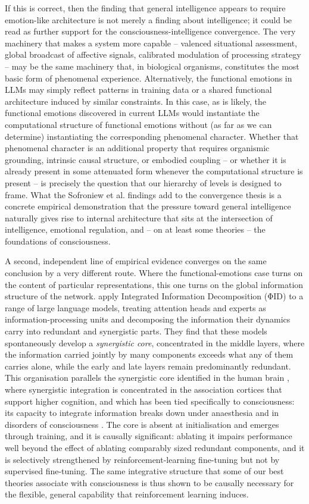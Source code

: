 \documentclass[11pt, a4paper, onecolumn, gdm]{google}
\begin{document}
If this is correct, then the finding that general intelligence appears to require emotion-like architecture is not merely a finding about intelligence; it could be read as further support for the consciousness-intelligence convergence.
The very machinery that makes a system more capable -- valenced situational assessment, global broadcast of affective signals, calibrated modulation of processing strategy -- may be the same machinery that, in biological organisms, constitutes the most basic form of phenomenal experience.
Alternatively, the functional emotions in LLMs may simply reflect patterns in training data or a shared functional architecture induced by similar constraints. In this case, as is likely, the functional emotions discovered in current LLMs would instantiate the computational structure of functional emotions without (as far as we can determine) instantiating the corresponding phenomenal character.
Whether that phenomenal character is an additional property that requires organismic grounding, intrinsic causal structure, or embodied coupling -- or whether it is already present in some attenuated form whenever the computational structure is present -- is precisely the question that our hierarchy of levels is designed to frame.
What the Sofroniew et al. findings add to the convergence thesis is a concrete empirical demonstration that the pressure toward general intelligence naturally gives rise to internal architecture that sits at the intersection of intelligence, emotional regulation, and -- on at least some theories -- the foundations of consciousness.

A second, independent line of empirical evidence converges on the same conclusion by a very different route.
Where the functional-emotions case turns on the content of particular representations, this one turns on the global information structure of the network.
\citet{urbinarodriguez2026} apply Integrated Information Decomposition (ΦID) to a range of large language models, treating attention heads and experts as information-processing units and decomposing the information their dynamics carry into redundant and synergistic parts.
They find that these models spontaneously develop a \emph{synergistic core}, concentrated in the middle layers, where the information carried jointly by many components exceeds what any of them carries alone, while the early and late layers remain predominantly redundant.
This organisation parallels the synergistic core identified in the human brain \citep{luppi2022}, where synergistic integration is concentrated in the association cortices that support higher cognition, and which has been tied specifically to consciousness: its capacity to integrate information breaks down under anaesthesia and in disorders of consciousness \citep{luppi2024}.
The core is absent at initialisation and emerges through training, and it is causally significant: ablating it impairs performance well beyond the effect of ablating comparably sized redundant components, and it is selectively strengthened by reinforcement-learning fine-tuning but not by supervised fine-tuning.
The same integrative structure that some of our best theories associate with consciousness is thus shown to be causally necessary for the flexible, general capability that reinforcement learning induces.
\end{document}
